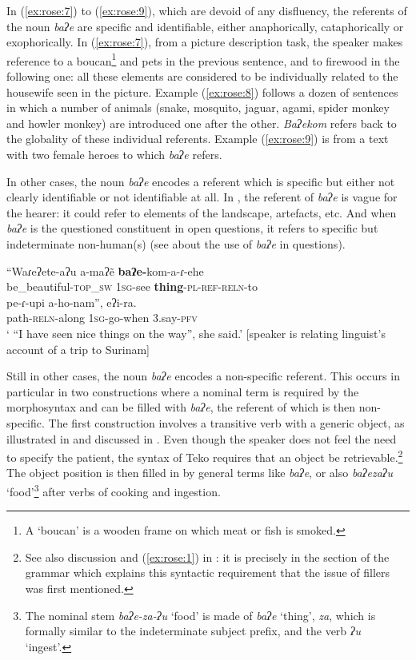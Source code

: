 \documentclass[output=paper]{langscibook}
\begin{document}
In (\ref{ex:rose:7}) to (\ref{ex:rose:9}), which are devoid of any disfluency, the referents of the noun \textit{baʔe} are specific and identifiable, either anaphorically, cataphorically or exophorically. In (\ref{ex:rose:7}), from a picture description task, the speaker makes reference to a boucan\footnote{A ‘boucan’ is a wooden frame on which meat or fish is smoked.} and pets in the previous sentence, and to firewood in the following one: all these elements are considered to be individually related to the housewife seen in the picture. Example (\ref{ex:rose:8}) follows a dozen of sentences in which a number of animals (snake, mosquito, jaguar, agami, spider monkey and howler monkey) are introduced one after the other. \textit{Baʔekom} refers back to the globality of these individual referents. Example (\ref{ex:rose:9}) is from a text with two female heroes to which \textit{baʔe} refers.

In other cases, the noun \textit{baʔe} encodes a referent which is specific but either not clearly identifiable or not identifiable at all. In , the referent of \textit{baʔe} is vague for the hearer: it could refer to elements of the landscape, artefacts, etc. And when \textit{baʔe} is the questioned constituent in open questions, it refers to specific but indeterminate non-human(s) (see  about the use of \textit{baʔe} in questions).

\ea \label{ex:rose:11}
\gll “Waɾeʔete-aʔu a-maʔẽ \textbf{baʔe-}kom-a-ɾ-ehe\\
be\_beautiful-\textsc{top}\_\textsc{sw} 1\textsc{sg}-see \textbf{thing}-\textsc{pl}-\textsc{ref}-\textsc{reln}-to\\
\gll pe-ɾ{}-upi	a-ho-nam”,	eʔi-ra.\\
path-\textsc{reln}{}-along	1\textsc{sg}{}-go-when	3.say-\textsc{pfv}\\
\glt ‘ “I have seen nice things on the way”, she said.’ [speaker is relating linguist’s account of a trip to Surinam] 
\z

Still in other cases, the noun \textit{baʔe} encodes a non-specific referent. This occurs in particular in two constructions where a nominal term is required by the morphosyntax and can be filled with \textit{baʔe}, the referent of which is then non-specific. The first construction involves a transitive verb with a generic object, as illustrated in  and discussed in \citet[176]{Rose2011}. Even though the speaker does not feel the need to specify the patient, the syntax of Teko requires that an object be retrievable.\footnote{See also discussion and (\ref{ex:rose:1}) in : it is precisely in the section of the grammar \citep{Rose2011} which explains this syntactic requirement that the issue of fillers was first mentioned.} The object position is then filled in by general terms like \textit{baʔe}, or also \textit{baʔe}\textit{zaʔu} ‘food’\footnote{The nominal stem \textit{baʔe-za-ʔu} `food’ is made of \textit{baʔe} ‘thing’, \textit{za}, which is formally similar to the indeterminate subject prefix, and the verb \textit{ʔu} ‘ingest’.\label{footnote:rose:9}} after verbs of cooking and ingestion.
\end{document}
